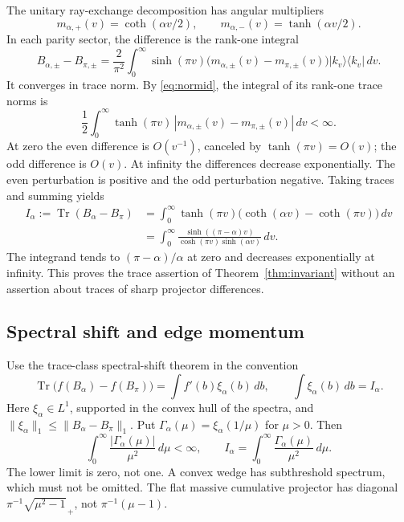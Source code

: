 \documentclass[11pt]{amsart}
\numberwithin{equation}{section}
\theoremstyle{remark}
\newcommand{\Tr}{\operatorname{Tr}}
\begin{document}
The unitary ray-exchange decomposition has angular multipliers
\begin{equation}\label{eq:parity}
m_{\alpha,+}(v)=\coth(\alpha v/2),\qquad m_{\alpha,-}(v)=\tanh(\alpha v/2).
\end{equation}
In each parity sector, the difference is the rank-one integral
\begin{equation}\label{eq:rankone}
B_{\alpha,\pm}-B_{\pi,\pm}=\frac{2}{\pi^2}\int_0^\infty\sinh(\pi v)\big(m_{\alpha,\pm}(v)-m_{\pi,\pm}(v)\big)|k_v\rangle\langle k_v|\,dv .
\end{equation}
It converges in trace norm. By \eqref{eq:normid}, the integral of its rank-one trace norms is
\begin{equation}\label{eq:tracenormint}
\frac12\int_0^\infty\tanh(\pi v)\,|m_{\alpha,\pm}(v)-m_{\pi,\pm}(v)|\,dv<\infty .
\end{equation}
At zero the even difference is $O(v^{-1})$, canceled by $\tanh(\pi v)=O(v)$; the odd difference is $O(v)$. At infinity the differences decrease exponentially. The even perturbation is positive and the odd perturbation negative. Taking traces and summing yields
\begin{equation}\label{eq:Ialpha}
\begin{aligned}
I_\alpha:=\Tr(B_\alpha-B_\pi)&=\int_0^\infty\tanh(\pi v)\big(\coth(\alpha v)-\coth(\pi v)\big)\,dv\\
&=\int_0^\infty\frac{\sinh((\pi-\alpha)v)}{\cosh(\pi v)\sinh(\alpha v)}\,dv .
\end{aligned}
\end{equation}
The integrand tends to $(\pi-\alpha)/\alpha$ at zero and decreases exponentially at infinity. This proves the trace assertion of Theorem~\ref{thm:invariant} without an assertion about traces of sharp projector differences.

\subsection{Spectral shift and edge momentum}
Use the trace-class spectral-shift theorem in the convention
\begin{equation}\label{eq:ssf}
\Tr\big(f(B_\alpha)-f(B_\pi)\big)=\int f'(b)\xi_\alpha(b)\,db,\qquad \int\xi_\alpha(b)\,db=I_\alpha .
\end{equation}
Here $\xi_\alpha\in L^1$, supported in the convex hull of the spectra, and $\|\xi_\alpha\|_1\le\|B_\alpha-B_\pi\|_1$. Put $\Gamma_\alpha(\mu)=\xi_\alpha(1/\mu)$ for $\mu>0$. Then
\begin{equation}\label{eq:Gamma}
\int_0^\infty\frac{|\Gamma_\alpha(\mu)|}{\mu^2}\,d\mu<\infty,\qquad I_\alpha=\int_0^\infty\frac{\Gamma_\alpha(\mu)}{\mu^2}\,d\mu .
\end{equation}
The lower limit is zero, not one. A convex wedge has subthreshold spectrum, which must not be omitted. The flat massive cumulative projector has diagonal $\pi^{-1}\sqrt{\mu^2-1}_{\,+}$, not $\pi^{-1}(\mu-1)$.
\end{document}
